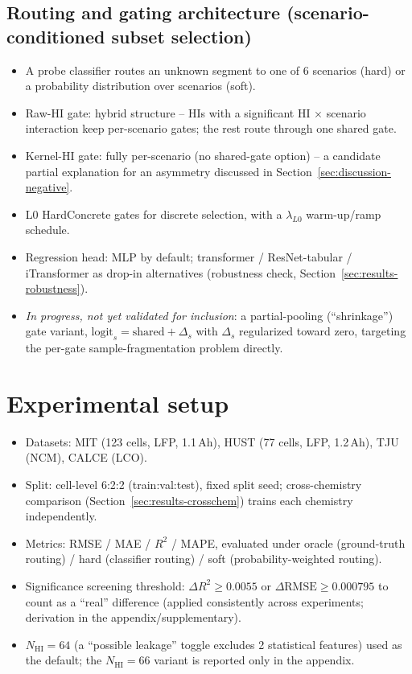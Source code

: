 \documentclass[preprint,12pt]{elsarticle}
\begin{document}
\subsection{Routing and gating architecture (scenario-conditioned subset selection)}
\label{sec:architecture}

\begin{itemize}
  \item A probe classifier routes an unknown segment to one of 6 scenarios (hard) or a probability distribution over scenarios (soft).
  \item Raw-HI gate: hybrid structure -- HIs with a significant HI $\times$ scenario interaction keep per-scenario gates; the rest route through one shared gate.
  \item Kernel-HI gate: fully per-scenario (no shared-gate option) -- a candidate partial explanation for an asymmetry discussed in Section~\ref{sec:discussion-negative}.
  \item L0 HardConcrete gates for discrete selection, with a $\lambda_{L0}$ warm-up/ramp schedule.
  \item Regression head: MLP by default; transformer / ResNet-tabular / iTransformer as drop-in alternatives (robustness check, Section~\ref{sec:results-robustness}).
  \item \emph{In progress, not yet validated for inclusion}: a partial-pooling (``shrinkage'') gate variant, $\text{logit}_s = \text{shared} + \Delta_s$ with $\Delta_s$ regularized toward zero, targeting the per-gate sample-fragmentation problem directly.
\end{itemize}

\section{Experimental setup}

\begin{itemize}
  \item Datasets: MIT (123 cells, LFP, 1.1\,Ah), HUST (77 cells, LFP, 1.2\,Ah), TJU (NCM), CALCE (LCO).
  \item Split: cell-level 6:2:2 (train:val:test), fixed split seed; cross-chemistry comparison (Section~\ref{sec:results-crosschem}) trains each chemistry independently.
  \item Metrics: RMSE / MAE / $R^2$ / MAPE, evaluated under oracle (ground-truth routing) / hard (classifier routing) / soft (probability-weighted routing).
  \item Significance screening threshold: $\Delta R^2 \geq 0.0055$ or $\Delta \text{RMSE} \geq 0.000795$ to count as a ``real'' difference (applied consistently across experiments; derivation in the appendix/supplementary).
  \item $N_\text{HI}=64$ (a ``possible leakage'' toggle excludes 2 statistical features) used as the default; the $N_\text{HI}=66$ variant is reported only in the appendix.
\end{itemize}
\end{document}

